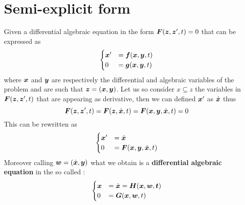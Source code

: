 \section{Semi-explicit form}
	Given a differential algebraic equation in the form $\boldsymbol{F}(\boldsymbol{z},\boldsymbol{z}', t) = 0$ that can be expressed as
	\[ \begin{cases}
		\boldsymbol{x}' & = \boldsymbol{f}(\boldsymbol{x}, \boldsymbol{y}, t) \\ 0 & = \boldsymbol{g}(\boldsymbol{x}, \boldsymbol{y}, t)
	\end{cases} \]
	where $\boldsymbol{x}$ and $\boldsymbol{y}$ are respectively the differential and algebraic variables of the problem and are such that $\boldsymbol{z} = (\boldsymbol{x} , \boldsymbol{y})$. Let us so consider $x \subseteq z$ the variables in $\boldsymbol{F}(\boldsymbol{z},\boldsymbol{z}', t)$ that are appearing as derivative, then we can defined $\boldsymbol{x}'$ as $\dot{\boldsymbol{x}}$ thus
	\[ \boldsymbol{F}(\boldsymbol{z}, \boldsymbol{z}', t) = \boldsymbol{F}(\boldsymbol{z}, \dot{\boldsymbol{x}}, t) = \boldsymbol{F} (\boldsymbol{x}, \boldsymbol{y}, \dot{\boldsymbol{x}}, t) = 0 \]
	This can be rewritten as
	\[ \begin{cases}
		\boldsymbol{x}' & = \dot{\boldsymbol{x}} \\
		0 & = \boldsymbol{F}(\boldsymbol{x}, \boldsymbol{y}, \dot{\boldsymbol{x}}, t)
	\end{cases} \]
	Moreover calling $\boldsymbol{w} = (\dot{\boldsymbol{x}}, \boldsymbol{y})$ what we obtain is a \textbf{differential algebraic equation} in the so called :
	\begin{equation}
	\begin{cases}
		\boldsymbol{x} & = \dot{\boldsymbol{x}} = \boldsymbol{H}(\boldsymbol{x}, \boldsymbol{w}, \boldsymbol{t}) \\
		0 & = \boldsymbol{G}(\boldsymbol{x}, \boldsymbol{w}, t)
	\end{cases}
	\end{equation}

